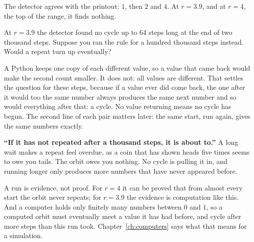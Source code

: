 
\noindent
The detector agrees with the printout: $1$, then $2$ and $4$. At
$r = \num{3.9}$, and at $r = 4$, the top of the range, it finds nothing.

\begin{think}
At $r = \num{3.9}$ the detector found no cycle up to $64$ steps long at the
end of two thousand steps. Suppose you ran the rule for a hundred thousand
steps instead. Would a repeat turn up eventually?
\end{think}



\noindent
A Python  keeps one copy of each different value, so a value that
came back would make the second count smaller. It does not: all
 values are different. That settles the question for
these  steps, because if a value ever did come back,
the one after it would too \dash{} the same number always produces the same
next number \dash{} and so would everything after that: a cycle. No value
returning means no cycle has begun. The second line of each pair matters
later: the same start, run again, gives the same numbers exactly.

\begin{trapbox}
\textbf{\enquote{If it has not repeated after a thousand steps, it is about
to.}} A long wait makes a repeat feel overdue, as a coin that has shown heads
five times seems to owe you tails. The orbit owes you nothing. No cycle is
pulling it in, and running longer only produces more numbers that have
never appeared before.
\end{trapbox}

\begin{rigourbox}
A run is evidence, not proof. For $r = 4$ it can be proved that from almost
every start the orbit never repeats; for $r = \num{3.9}$ the evidence is
computation like this. And a computer holds only finitely many numbers
between $0$ and $1$, so a computed orbit must eventually meet a value it has
had before, and cycle \dash{} after more steps than this run took.
Chapter~\ref{ch:computers} says what that means for a simulation.
\end{rigourbox}

